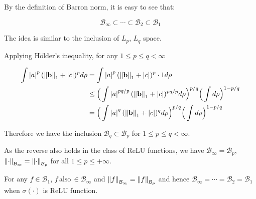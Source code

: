 By the definition of Barron norm, it is easy to see that:

\begin{equation}
    \mathcal{B}_{\infty} \subset \cdots \subset \mathcal{B}_{2} \subset \mathcal{B}_1
\end{equation}



The idea is similar to the inclusion of $L_p$, $L_q$ space.

Applying Hölder's inequality, for any $1 \leq p \leq q < \infty$

\begin{align*}
    \int \left| a \right|^p (\left\| \mathbf{b} \right\|_1 + \left| c \right|)^p d\rho
     & = \int \left| a \right|^p (\left\| \mathbf{b} \right\|_1 + \left| c \right|)^p \cdot 1 d\rho                                                    \\
     & \leq \Big(\int \left| a \right|^{pq/p} (\left\| \mathbf{b} \right\|_1 + \left| c \right|)^{pq/p} d\rho \Big)^{p/q} \Big(\int d\rho\Big)^{1-p/q} \\
     & = \Big(\int \left| a \right|^q (\left\| \mathbf{b} \right\|_1 + \left| c \right|)^q d\rho \Big)^{p/q} \Big(\int d\rho\Big)^{1-p/q}
\end{align*}

Therefore we have the inclusion $\mathcal{B}_{q} \subset \mathcal{B}_p$ for $1
    \leq p \leq q < \infty$. 

As the reverse also holds in the class of ReLU functions,  we have
$\mathcal{B}_{\infty} = \mathcal{B}_p$, $\left\lVert\cdot\right\rVert_{\mathcal{B}_\infty} =
    \left\lVert\cdot\right\rVert_{\mathcal{B}_p}$  for all $1 \leq p \leq +\infty$.

\begin{lemma}\label{lamma:equivalence_barron_space}

    For any $f \in \mathcal{B}_1$, $f
        \,\text{also}\, \in \mathcal{B}_{\infty}$ and $\left\lVert f\right\rVert_{\mathcal{B}_\infty} =
        \left\lVert f\right\rVert_{\mathcal{B}_p}$ and hence $ \mathcal{B}_{\infty} = \cdots =
        \mathcal{B}_{2} = \mathcal{B}_1$ when $\sigma(\cdot)$ is ReLU function.
\end{lemma}

